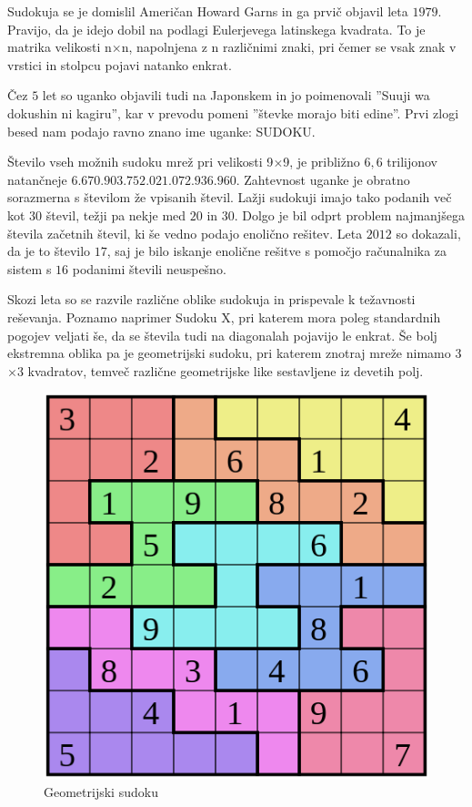 \documentclass[A4paper, 11pt]{article}
\begin{document}
\pagebreak

Sudokuja se je domislil Američan Howard Garns in ga prvič objavil leta $1979$. Pravijo, da je idejo dobil na podlagi Eulerjevega latinskega kvadrata. To je matrika velikosti n$\times$n, napolnjena z n različnimi znaki, pri čemer se vsak znak v vrstici in stolpcu pojavi natanko enkrat.

Čez $5$ let so uganko objavili tudi na Japonskem in jo poimenovali ''Suuji wa dokushin ni kagiru'', kar v prevodu pomeni ''števke morajo biti edine''. Prvi zlogi besed nam podajo ravno znano ime uganke: SUDOKU.

Število vseh možnih sudoku mrež pri velikosti 9$\times$9, je približno $6,6$ trilijonov natančneje $6.670.903.752.021.072.936.960$. Zahtevnost uganke je obratno sorazmerna s številom že vpisanih števil. Lažji sudokuji imajo tako podanih več kot $30$ števil, težji pa nekje med $20$ in $30$. Dolgo je bil odprt problem najmanjšega števila začetnih števil, ki še vedno podajo enolično rešitev. Leta $2012$ so dokazali, da je to število $17$, saj je bilo iskanje enolične rešitve s pomočjo računalnika za sistem s $16$ podanimi števili neuspešno.

Skozi leta so se razvile različne oblike sudokuja in prispevale k težavnosti reševanja. Poznamo naprimer Sudoku X, pri katerem mora poleg standardnih pogojev veljati še, da se števila tudi na diagonalah pojavijo le enkrat. Še bolj ekstremna oblika pa je geometrijski sudoku, pri katerem znotraj mreže nimamo 3$\times$3 kvadratov, temveč različne geometrijske like sestavljene iz devetih polj.

\begin{figure}[h]
\centering
\caption{Geometrijski sudoku}
\includegraphics[scale=0.4]{geo_sudoku}
\end{figure}
\end{document}
